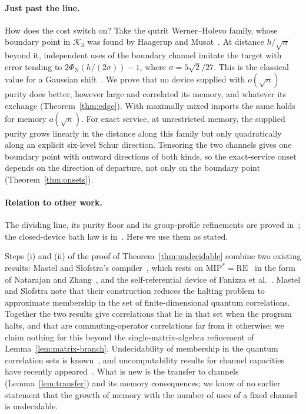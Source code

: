 \documentclass[11pt]{article}
\theoremstyle{definition}
\theoremstyle{remark}
\newcommand{\K}{\mathcal K}
\newcommand{\Ncdf}{\Phi_{\mathrm N}}
\begin{document}
\paragraph{Just past the line.}
How does the cost switch on? Take the qutrit Werner--Holevo family, whose boundary point in $\K_3$ was found by Haagerup and Musat~\cite{HM2015}. At distance $h/\sqrt n$ beyond it, independent uses of the boundary channel imitate the target with error tending to $2\Ncdf(h/(2\sigma))-1$, where $\sigma=5\sqrt2/27$. This is the classical value for a Gaussian shift~\cite{CopePirandola,WildeEtAl,vanderVaart}. We prove that no device supplied with $o(\sqrt n)$ purity does better, however large and correlated its memory, and whatever its exchange (Theorem~\ref{thm:edge}). With maximally mixed imports the same holds for memory $o(\sqrt n)$. For exact service, at unrestricted memory, the supplied purity grows linearly in the distance along this family but only quadratically along an explicit six-level Schur direction. Tensoring the two channels gives one boundary point with outward directions of both kinds, so the exact-service onset depends on the direction of departure, not only on the boundary point (Theorem~\ref{thm:onsets}).

\paragraph{Relation to other work.}
The dividing line, its purity floor and its group-profile refinements are proved in~\cite{Memory,Law}; the closed-device bath law is in~\cite{ClosedMemory}. Here we use them as stated.

Steps (i) and (ii) of the proof of Theorem~\ref{thm:undecidable} combine two existing results: Mastel and Slofstra's compiler~\cite[Corollary~9.16]{MastelSlofstra}, which rests on $\mathrm{MIP}^*=\mathrm{RE}$~\cite{MIP} in the form of Natarajan and Zhang~\cite{NatarajanZhang}, and the self-referential device of Fanizza et al.~\cite[Section~4.2]{FanizzaEtAl}. Mastel and Slofstra note that their construction reduces the halting problem to approximate membership in the set of finite-dimensional quantum correlations. Together the two results give correlations that lie in that set when the program halts, and that are commuting-operator correlations far from it otherwise; we claim nothing for this beyond the single-matrix-algebra refinement of Lemma~\ref{lem:matrix-branch}. Undecidability of membership in the quantum correlation sets is known~\cite{Slofstra19,CoudronSlofstra,FuMillerSlofstra,MastelSlofstra}, and uncomputability results for channel capacities have recently appeared~\cite{BMZ}. What is new is the transfer to channels (Lemma~\ref{lem:transfer}) and its memory consequences; we know of no earlier statement that the growth of memory with the number of uses of a fixed channel is undecidable.
\end{document}

